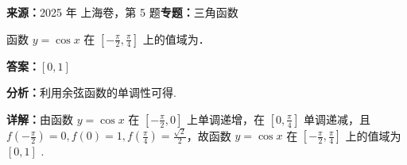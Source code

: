 \begin{question}[points=4]
\textbf{来源：}2025 年 上海卷，第 5 题\quad \textbf{专题：}三角函数\par
函数 $y = \cos x$ 在 $\left[-\frac{\pi}{2}, \frac{\pi}{4}\right]$ 上的值域为．
\fillin[{$[0,1]$}]
\begin{solution}
\textbf{答案：}$[0,1]$

\textbf{分析：}利用余弦函数的单调性可得.

\textbf{详解：}由函数 $y = \cos x$ 在 $\left[-\frac{\pi}{2}, 0\right]$ 上单调递增，在 $\left[0, \frac{\pi}{4}\right]$ 单调递减，且 $f(-\frac{\pi}{2}) = 0, f(0) = 1, f(\frac{\pi}{4}) = \frac{\sqrt{2}}{2}$，故函数 $y = \cos x$ 在 $\left[-\frac{\pi}{2}, \frac{\pi}{4}\right]$ 上的值域为 $[0,1]$ .
\end{solution}
\end{question}

